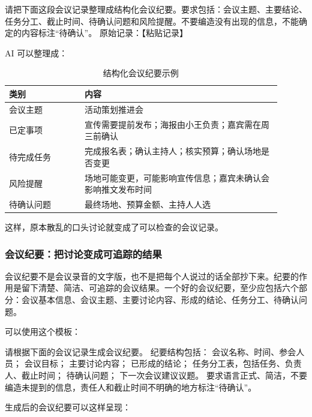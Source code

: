 \begin{tcolorbox}[promptbox]
请把下面这段会议记录整理成结构化会议纪要。要求包括：会议主题、主要结论、任务分工、截止时间、待确认问题和风险提醒。不要编造没有出现的信息，不能确定的内容标注“待确认”。
原始记录：【粘贴记录】
\end{tcolorbox}

AI 可以整理成：

\begin{table}[H]
\centering
\caption{结构化会议纪要示例}
\label{tab:structured-meeting-minutes-example}
\begin{tabular}{p{0.25\linewidth} p{0.65\linewidth}}
\toprule
\textbf{类别} & \textbf{内容} \\
\midrule
会议主题 & 活动策划推进会 \\
已定事项 & 宣传需要提前发布；海报由小王负责；嘉宾需在周三前确认 \\
待完成任务 & 完成报名表；确认主持人；核实预算；确认场地是否变更 \\
风险提醒 & 场地可能变更，可能影响宣传信息；嘉宾未确认会影响推文发布时间 \\
待确认问题 & 最终场地、预算金额、主持人人选 \\
\bottomrule
\end{tabular}
\end{table}

这样，原本散乱的口头讨论就变成了可以检查的会议记录。

\subsubsection*{会议纪要：把讨论变成可追踪的结果}

会议纪要不是会议录音的文字版，也不是把每个人说过的话全部抄下来。纪要的作用是留下清楚、简洁、可追踪的会议结果。一个好的会议纪要，至少应包括六个部分：会议基本信息、会议主题、主要讨论内容、形成的结论、任务分工、待确认问题。

可以使用这个模板：

\begin{tcolorbox}[promptbox]
请根据下面的会议记录生成会议纪要。
纪要结构包括：
会议名称、时间、参会人员；
会议目标；
主要讨论内容；
已形成的结论；
任务分工表，包括任务、负责人、截止时间；
待确认问题；
下一次会议建议议题。
要求语言正式、简洁，不要编造未提到的信息，责任人和截止时间不明确的地方标注“待确认”。
\end{tcolorbox}

生成后的会议纪要可以这样呈现：

